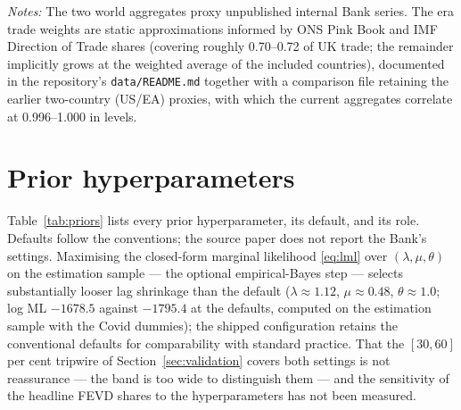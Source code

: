 \begin{table}[h]
\begin{tabular}{p{1.9cm}p{3.8cm}p{3.3cm}p{4.5cm}}
\bottomrule
\end{tabular}
\par\smallskip
\parbox{0.97\textwidth}{\footnotesize \emph{Notes:} The two world aggregates proxy unpublished internal Bank series. The era trade weights are static approximations informed by ONS Pink Book and IMF Direction of Trade shares (covering roughly 0.70--0.72 of UK trade; the remainder implicitly grows at the weighted average of the included countries), documented in the repository's \texttt{data/README.md} together with a comparison file retaining the earlier two-country (US/EA) proxies, with which the current aggregates correlate at 0.996--1.000 in levels.}
\end{table}

\section{Prior hyperparameters}
\label{app:priors}

Table~\ref{tab:priors} lists every prior hyperparameter, its default, and its role. Defaults follow the \citet{giannone2015} conventions; the source paper does not report the Bank's settings. Maximising the closed-form marginal likelihood \eqref{eq:lml} over $(\lambda, \mu, \theta)$ on the estimation sample --- the optional empirical-Bayes step --- selects substantially looser lag shrinkage than the default ($\lambda \approx 1.12$, $\mu \approx 0.48$, $\theta \approx 1.0$; log ML $-1678.5$ against $-1795.4$ at the defaults, computed on the estimation sample with the Covid dummies); the shipped configuration retains the conventional defaults for comparability with standard practice. That the $[30,60]$ per cent tripwire of Section~\ref{sec:validation} covers both settings is not reassurance --- the band is too wide to distinguish them --- and the sensitivity of the headline FEVD shares to the hyperparameters has not been measured.

